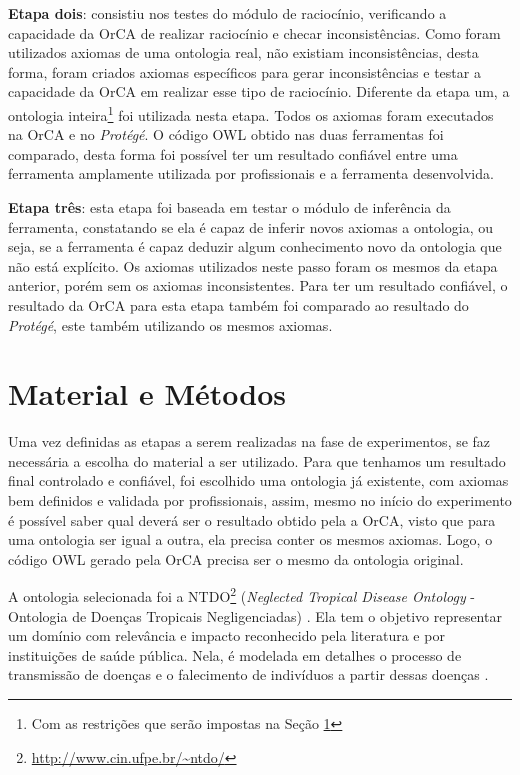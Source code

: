 \documentclass{bcc}
\begin{document}
\textbf{Etapa dois}: consistiu nos testes do módulo de raciocínio, verificando a capacidade da OrCA de realizar raciocínio e checar inconsistências. Como foram utilizados axiomas de uma ontologia real, não existiam inconsistências, desta forma, foram criados axiomas específicos para gerar inconsistências e testar a capacidade da OrCA em realizar esse tipo de raciocínio. Diferente da etapa um, a ontologia inteira\footnote{Com as restrições que serão impostas na Seção \ref{sec:materialemetodo}} foi utilizada nesta etapa. Todos os axiomas foram executados na OrCA e no \textit{Protégé}. O código OWL obtido nas duas ferramentas foi comparado, desta forma foi possível ter um resultado confiável entre uma ferramenta amplamente utilizada por profissionais e a ferramenta desenvolvida.

\textbf{Etapa três}: esta etapa foi baseada em testar o módulo de inferência da ferramenta, constatando se ela é capaz de inferir novos axiomas a ontologia, ou seja, se a ferramenta é capaz deduzir algum conhecimento novo da ontologia que não está explícito. Os axiomas utilizados neste passo foram os mesmos da etapa anterior, porém sem os axiomas inconsistentes. Para ter um resultado confiável, o resultado da OrCA para esta etapa também foi comparado ao resultado do \textit{Protégé}, este também utilizando os mesmos axiomas.

\section{Material e Métodos}
\label{sec:materialemetodo}

Uma vez definidas as etapas a serem realizadas na fase de experimentos, se faz necessária a escolha do material a ser utilizado. Para que tenhamos um resultado final controlado e confiável, foi escolhido uma ontologia já existente, com axiomas bem definidos e validada por profissionais, assim, mesmo no início do experimento é possível saber qual deverá ser o resultado obtido pela a OrCA, visto que para uma ontologia ser igual a outra, ela precisa conter os mesmos axiomas. Logo, o código OWL gerado pela OrCA precisa ser o mesmo da ontologia original. 

A ontologia selecionada foi a  NTDO\footnote{\url{http://www.cin.ufpe.br/\~ntdo/}} (\textit{Neglected Tropical Disease Ontology} - Ontologia de Doenças Tropicais Negligenciadas) \cite{ntdo}. Ela tem o objetivo representar um domínio com relevância e impacto reconhecido pela literatura e por instituições de saúde pública. Nela, é modelada em detalhes o processo de transmissão de doenças e o falecimento de indivíduos a partir dessas doenças \cite{ntdo}.
\end{document}
